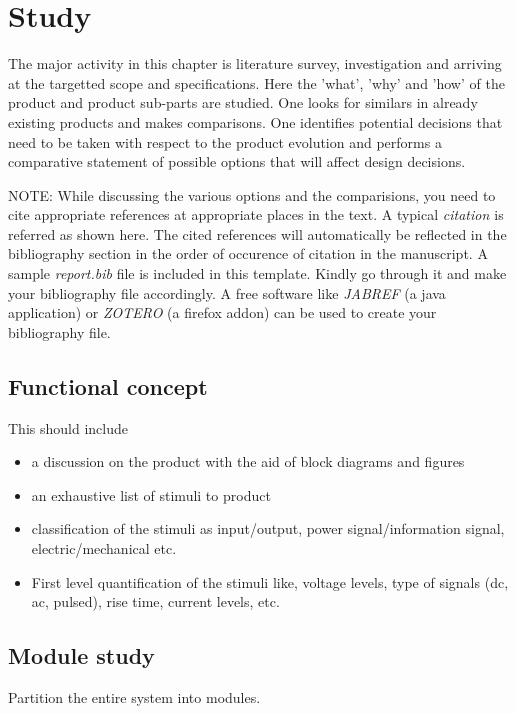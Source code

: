 
\chapter{Study}

The major activity in this chapter is literature survey, investigation
and arriving at the targetted scope and specifications. Here the 'what',
'why' and 'how' of the product and product sub-parts are studied.
One looks for similars in already existing products and makes comparisons.
One identifies potential decisions that need to be taken with respect
to the product evolution and performs a comparative statement of possible
options that will affect design decisions. 

NOTE: While discussing the various options and the comparisions, you
need to cite appropriate references at appropriate places in the text.
A typical \emph{citation \cite{breedveld1991sic}} is referred as
shown here. The cited references will automatically be reflected in
the bibliography section in the order of occurence of citation in
the manuscript. A sample \emph{report.bib} file is included in this
template. Kindly go through it and make your bibliography file accordingly.
A free software like \emph{JABREF} (a java application) or \emph{ZOTERO}
(a firefox addon) \cite{karmakar1990dec} can be used to create your
bibliography file.

\section{Functional concept}

This should include 
\begin{itemize}
\item a discussion on the product with the aid of block diagrams and figures
\cite{thoma1976ibg}
\item an exhaustive list of stimuli to product
\item classification of the stimuli as input/output, power signal/information
signal, electric/mechanical etc.
\item First level quantification of the stimuli like, voltage levels, type
of signals (dc, ac, pulsed), rise time, current levels, etc.
\end{itemize}

\section{Module study}

Partition the entire system into modules.

